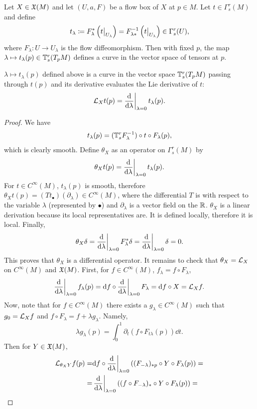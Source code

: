 Let $X\in \mathfrak{X}(M)$ and let $(U,a,F)$ be a flow box of $X$ at $p\in M$. Let $t\in\Gamma^r_s(M)$ and define
\[t_\lambda\coloneqq F_{\lambda}^\ast \left(\restr{t}{U_\lambda}\right)=F_{\lambda\ast}^{-1} \left(\restr{t}{U_\lambda}\right)\in\Gamma^r_s(U),\]
where $F_\lambda :U\to U_\lambda$ is the flow diffeomorphism. Then with fixed $p$, the map $\lambda\mapsto t_\lambda (p) \in \mathbb{T}^r_s (T_p M)$ defines a curve in the vector space of tensors at $p$.
\begin{thm}
    $\lambda\mapsto t_\lambda (p)$ defined above is a curve in the vector space $\mathbb{T}^r_s (T_p M)$ passing through $t(p)$ and its derivative evaluates the Lie derivative of $t$:
    \[\Lie_X t(p)=\restr{\frac{\dd}{\dd \lambda}}{\lambda=0}t_\lambda(p).\]
\end{thm}
\begin{proof}
    We have 
    \[t_\lambda(p)=(\mathbb{T}^r_s F_\lambda^{-1})\circ t \circ F_\lambda(p),\] 
    which is clearly smooth.
    Define $\theta_X$ as an operator on $\Gamma^r_s(M)$ by 
    \[\theta_X t(p)=\restr{\frac{\dd}{\dd \lambda}}{\lambda=0} t_\lambda(p).\]
    For $t\in C^\infty(M)$, $t_\lambda(p)$ is smooth, therefore $\theta_X t(p)=(Tt_\bullet)(\partial_\lambda)\in C^\infty(M)$, where the differential $T$ is with respect to the variable $\lambda$ (represented by $\bullet$) and  $\partial_\lambda$ is a vector field on the $\mathbb{R} $. $\theta_X$ is a linear derivation because its local representatives are. It is defined locally, therefore it is local. Finally, 
    \[\theta_X\delta=\restr{\frac{\dd}{\dd \lambda}}{\lambda=0} F^\ast_\lambda \delta=\restr{\frac{\dd}{\dd \lambda}}{\lambda=0}\delta=0.\] 
    This proves that $\theta_X$ is a differential operator. It remains to check that $\theta_X=\mathcal{L}_X$ on $C^\infty(M)$ and $\mathfrak{X}(M)$. First, for $f\in C^\infty(M)$, 
    $f_\lambda=f\circ F_\lambda$, 
    \[\restr{\frac{\dd}{\dd \lambda}}{\lambda=0}f_\lambda(p)=\dd f\circ \restr{\frac{\dd}{\dd \lambda}}{\lambda=0}F_\lambda=\dd f\circ X=\Lie_X f.\]
    Now, note that for $f\in C^\infty(M)$ there exists a $g_\lambda\in C^\infty(M)$ such that $g_0=\mathcal{L}_X f$ and $f\circ F_\lambda=f+\lambda g_\lambda$. Namely, 
    \[\lambda g_\lambda (p)=\int_0^1 \partial_t(f\circ F_{t\lambda}(p))\dd t.\] 
    Then for $Y\in\mathfrak{X}(M)$,
    \begin{align}
        \Lie_{\theta_X Y}f(p)=&\dd f\circ \restr{\frac{\dd}{\dd \lambda}}{\lambda=0} \left((F_{-\lambda})_{\ast p}\circ Y\circ F_\lambda(p)\right)=\\
        =&\restr{\frac{\dd}{\dd \lambda}}{\lambda=0}\left((f\circ F_{-\lambda})_\ast\circ Y\circ F_\lambda(p)\right)=\\

\end{align}
\end{proof}
